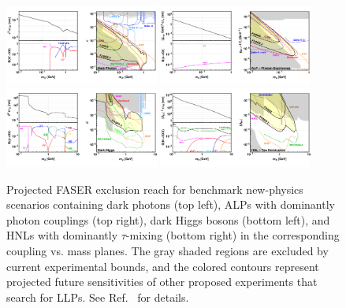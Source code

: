 
\begin{figure}[t]
\centering
\includegraphics[trim={17.6cm 0 0 0}, clip, width=0.45\textwidth]{figures/faser/Reach_DarkPhoton.pdf}
\includegraphics[trim={17.6cm 0 0 0}, clip, width=0.45\textwidth]{figures/faser/Reach_ALP.pdf} \hspace{2cm}
\includegraphics[trim={17.6cm 0 0 0}, clip, width=0.45\textwidth]{figures/faser/Reach_DarkHiggs.pdf} 
\includegraphics[trim={17.6cm 0 0 0}, clip, width=0.45\textwidth]{figures/faser/Reach_HNL.pdf}
\caption{
Projected FASER exclusion reach for benchmark new-physics scenarios containing dark photons (top left), ALPs with dominantly photon couplings (top right), dark Higgs bosons (bottom left), and HNLs with dominantly $\tau$-mixing (bottom right) in the corresponding coupling vs. mass planes. The gray shaded regions are excluded by current experimental bounds, and the colored contours represent projected future sensitivities of other proposed experiments that search for LLPs. See Ref.~\cite{Ariga:2018uku} for details. 
}
\label{fig:Reach}
\end{figure}


